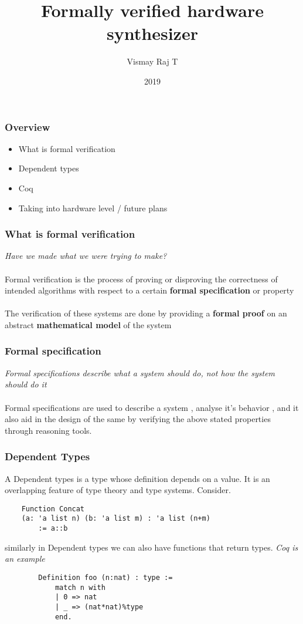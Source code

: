 \documentclass{beamer}
\title{Formally verified hardware synthesizer}
\author{Vismay Raj T}
\institute{IIT Palakkad}
\date{2019}
\begin{document}
 
\frame{\titlepage}
 
\begin{frame}
    \frametitle{Overview}
    \begin{itemize}
        \item What is formal verification
        \item Dependent types
        \item Coq
        \item Taking into hardware level / future plans
    \end{itemize}
\end{frame}

\begin{frame}
    \frametitle{What is formal verification}
    \textit{Have we made what we were trying to make?} \\~\\ 
    Formal verification is the process of proving or disproving the correctness of intended algorithms
    with respect to a certain \textbf{formal specification} or property \\~\\
    The verification of these systems are done by providing a \textbf{formal proof} on an abstract 
    \textbf{mathematical model} of the system
    \vfill
\end{frame}

\begin{frame}
    \frametitle{Formal specification}

    \textit{Formal specifications describe what a system should do, not how the system should do it}\\~\\

    Formal specifications are used to describe a system , analyse it's behavior , and it also aid in the 
    design of the same by verifying the above stated properties through reasoning tools.

    \vfill

\end{frame}

\begin{frame}[fragile]
    \frametitle{Dependent Types}

    A Dependent types is a type whose definition depends on a value. It is an overlapping feature of type 
    theory and type systems. Consider.
    \begin{verbatim}
    Function Concat 
    (a: 'a list n) (b: 'a list m) : 'a list (n+m) 
        := a::b
    \end{verbatim}
    similarly in Dependent types we can also have functions that return types. \textit{Coq is an example}
    \begin{verbatim}
        Definition foo (n:nat) : type :=
            match n with
            | 0 => nat
            | _ => (nat*nat)%type
            end.
    \end{verbatim}
\end{frame}
\end{document}
